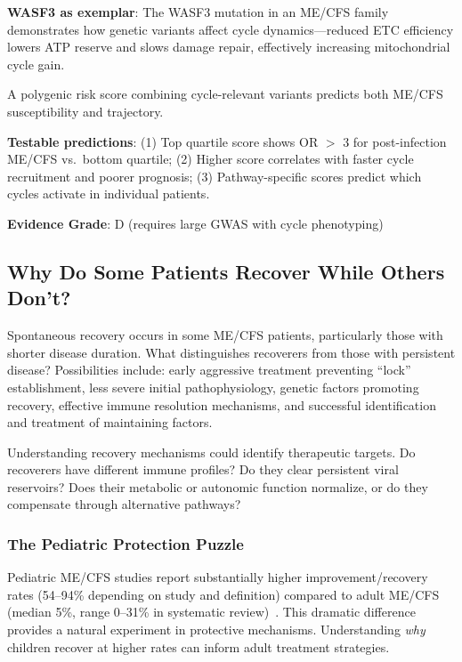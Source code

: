\textbf{WASF3 as exemplar}: The WASF3 mutation in an ME/CFS family~\cite{Syed2025} demonstrates how genetic variants affect cycle dynamics---reduced ETC efficiency lowers ATP reserve and slows damage repair, effectively increasing mitochondrial cycle gain.

\begin{hypothesis}
A polygenic risk score combining cycle-relevant variants predicts both ME/CFS susceptibility and trajectory.

\textbf{Testable predictions}: (1) Top quartile score shows OR $>$ 3 for post-infection ME/CFS vs.\ bottom quartile; (2) Higher score correlates with faster cycle recruitment and poorer prognosis; (3) Pathway-specific scores predict which cycles activate in individual patients.

\textbf{Evidence Grade}: D (requires large GWAS with cycle phenotyping)
\end{hypothesis}

\subsection{Why Do Some Patients Recover While Others Don't?}

Spontaneous recovery occurs in some ME/CFS patients, particularly those with shorter disease duration. What distinguishes recoverers from those with persistent disease? Possibilities include: early aggressive treatment preventing ``lock'' establishment, less severe initial pathophysiology, genetic factors promoting recovery, effective immune resolution mechanisms, and successful identification and treatment of maintaining factors.

Understanding recovery mechanisms could identify therapeutic targets. Do recoverers have different immune profiles? Do they clear persistent viral reservoirs? Does their metabolic or autonomic function normalize, or do they compensate through alternative pathways?

\subsubsection{The Pediatric Protection Puzzle}
\label{subsubsec:pediatric-protection}

Pediatric ME/CFS studies report substantially higher improvement/recovery rates (54--94\% depending on study and definition) compared to adult ME/CFS (median 5\%, range 0--31\% in systematic review)~\cite{Rowe2017pediatric,Cairns2005prognosis}. This dramatic difference provides a natural experiment in protective mechanisms. Understanding \textit{why} children recover at higher rates can inform adult treatment strategies.

